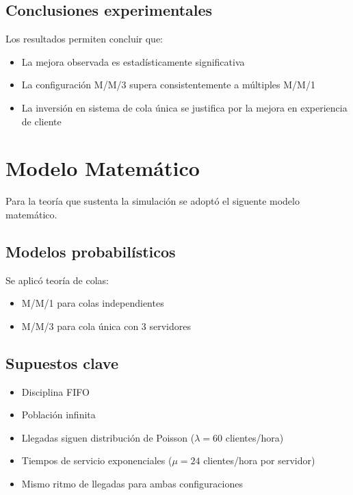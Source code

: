 \documentclass{article}
\begin{document}
\subsection{Conclusiones experimentales}
Los resultados permiten concluir que:
\begin{itemize}
    \item La mejora observada es estadísticamente significativa 
    \item La configuración M/M/3 supera consistentemente a múltiples M/M/1
    \item La inversión en sistema de cola única se justifica por la mejora en experiencia de cliente
\end{itemize}

\section{Modelo Matemático}\label{sec:modelo}

Para la teoría que sustenta la simulación se adoptó el siguente modelo matemático.

\subsection{Modelos probabilísticos}
Se aplicó teoría de colas:
\begin{itemize}
    \item M/M/1 para colas independientes
    \item M/M/3 para cola única con 3 servidores
\end{itemize}

\subsection{Supuestos clave}
\begin{itemize}
    \item Disciplina FIFO
    \item Población infinita
    \item Llegadas siguen distribución de Poisson ($\lambda = 60$ clientes/hora)
    \item Tiempos de servicio exponenciales ($\mu = 24$ clientes/hora por servidor)
    \item Mismo ritmo de llegadas para ambas configuraciones
\end{itemize}
\end{document}
